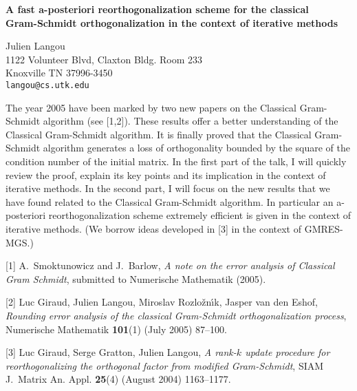 \documentclass{report}
\begin{document}

\begin{center}
{\large
{\bf A fast a-posteriori reorthogonalization scheme for the classical \\
	Gram-Schmidt orthogonalization in the context of iterative methods}}

	Julien Langou \\
	1122 Volunteer Blvd, Claxton Bldg. Room 233 \\
	Knoxville TN 37996-3450 \\
	{\tt langou@cs.utk.edu}
\end{center}
The year 2005 have been marked by two new papers on the
Classical Gram-Schmidt algorithm (see [1,2]). These results
offer a better understanding of the Classical Gram-Schmidt
algorithm. It is finally proved that the Classical
Gram-Schmidt algorithm generates a loss of orthogonality
bounded by the square of the condition number of the initial
matrix. In the first part of the talk, I will quickly review
the proof, explain its key points and its implication in the
context of iterative methods. In the second part, I will
focus on the new results that we have found related to the
Classical Gram-Schmidt algorithm. In particular an
a-posteriori reorthogonalization scheme extremely efficient
is given in the context of iterative methods. (We borrow
ideas developed in [3] in the context of GMRES-MGS.)

[1] A.~Smoktunowicz and J.~Barlow,
{\em A note on the error analysis of Classical Gram Schmidt},
submitted to Numerische Mathematik (2005).

[2] Luc Giraud, Julien Langou, Miroslav Rozlo\v{z}n\'{\i}k,
Jasper van den Eshof, {\em Rounding error analysis of
the classical Gram-Schmidt orthogonalization process},
Numerische Mathematik {\bf 101}(1) (July 2005) 87--100.

[3] Luc Giraud, Serge Gratton, Julien Langou,
{\em A rank-$k$ update procedure for
reorthogonalizing the orthogonal factor from modified
Gram-Schmidt}, SIAM J.~Matrix An. Appl. {\bf 25}(4)
(August 2004) 1163--1177.



\end{document}
